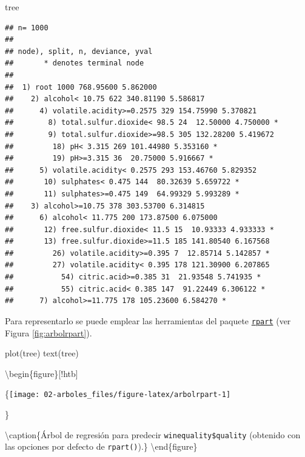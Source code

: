 \documentclass[
  spanish,
]{book}
\newenvironment{Shaded}{\begin{snugshade}}{\end{snugshade}}
\newcommand{\FunctionTok}[1]{\textcolor[rgb]{0.00,0.00,0.00}{#1}}
\newcommand{\NormalTok}[1]{#1}
\theoremstyle{break}
\theoremstyle{definition}
\theoremstyle{definition}
\theoremstyle{definition}
\theoremstyle{definition}
\theoremstyle{remark}
\begin{document}
\begin{Shaded}
\begin{Highlighting}[]
\NormalTok{tree}
\end{Highlighting}
\end{Shaded}

\begin{verbatim}
## n= 1000 
## 
## node), split, n, deviance, yval
##       * denotes terminal node
## 
##  1) root 1000 768.95600 5.862000  
##    2) alcohol< 10.75 622 340.81190 5.586817  
##      4) volatile.acidity>=0.2575 329 154.75990 5.370821  
##        8) total.sulfur.dioxide< 98.5 24  12.50000 4.750000 *
##        9) total.sulfur.dioxide>=98.5 305 132.28200 5.419672  
##         18) pH< 3.315 269 101.44980 5.353160 *
##         19) pH>=3.315 36  20.75000 5.916667 *
##      5) volatile.acidity< 0.2575 293 153.46760 5.829352  
##       10) sulphates< 0.475 144  80.32639 5.659722 *
##       11) sulphates>=0.475 149  64.99329 5.993289 *
##    3) alcohol>=10.75 378 303.53700 6.314815  
##      6) alcohol< 11.775 200 173.87500 6.075000  
##       12) free.sulfur.dioxide< 11.5 15  10.93333 4.933333 *
##       13) free.sulfur.dioxide>=11.5 185 141.80540 6.167568  
##         26) volatile.acidity>=0.395 7  12.85714 5.142857 *
##         27) volatile.acidity< 0.395 178 121.30900 6.207865  
##           54) citric.acid>=0.385 31  21.93548 5.741935 *
##           55) citric.acid< 0.385 147  91.22449 6.306122 *
##      7) alcohol>=11.775 178 105.23600 6.584270 *
\end{verbatim}

Para representarlo se puede emplear las herramientas del paquete \href{https://CRAN.R-project.org/package=rpart}{\texttt{rpart}} (ver Figura \ref{fig:arbolrpart}).

\begin{Shaded}
\begin{Highlighting}[]
\FunctionTok{plot}\NormalTok{(tree)}
\FunctionTok{text}\NormalTok{(tree)}
\end{Highlighting}
\end{Shaded}

\textbackslash begin\{figure\}{[}!htb{]}

\{\centering \texttt{[image: 02-arboles\_files/figure-latex/arbolrpart-1]}

\}

\textbackslash caption\{Árbol de regresión para predecir \texttt{winequality\$quality} (obtenido con las opciones por defecto de \texttt{rpart()}).\}\label{fig:arbolrpart}
\textbackslash end\{figure\}
\end{document}
